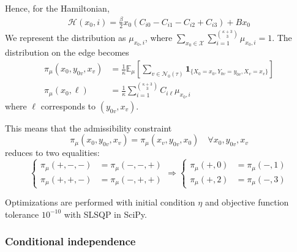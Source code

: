\documentclass[12pt]{article}
\numberwithin{equation}{section}
\begin{document}
Hence, for the Hamiltonian,
\begin{align*}
    \mathcal{H}(x_0, i) = \frac\beta2x_0(C_{i0} - C_{i1} - C_{i2} + C_{i3}) + Bx_0
\end{align*}
We represent the distribution as $\mu_{x_0, i}$, where $\sum_{x_0\in \mathcal{X}}\sum_{i=1}^{\kappa+3 \choose 3} \mu_{x_0, i} = 1$.
The distribution on the edge becomes
\begin{align*}
    \pi_\mu(x_0, y_{0v}, x_v) & = \frac1\kappa\mathbb{E}_\mu\left[\sum_{v\in\mathcal{N_0(\tau)}}\mathbf{1}_{\{X_0=x_0, Y_{0v}=y_{0v}, X_v=x_v\}}\right] \\
    \pi_\mu(x_0, \ell)        & = \frac1\kappa\sum_{i=1}^{\kappa+3 \choose 3} C_{i\ell}\mu_{x_0, i}
\end{align*}
where $\ell$ corresponds to $(y_{0v}, x_v)$.

This means that the admissibility constraint
\begin{equation*}
    \pi_\mu(x_0, y_{0v}, x_v) = \pi_\mu(x_v, y_{0v}, x_0) \quad \forall x_0, y_{0v}, x_v
\end{equation*}
reduces to two equalities:
\begin{equation*}
    \begin{cases}
        \pi_\mu(+, -, -) & = \pi_\mu(-, -, +) \\
        \pi_\mu(+, +, -) & = \pi_\mu(-, +, +)
    \end{cases}
    \Rightarrow
    \begin{cases}
        \pi_\mu(+, 0) & = \pi_\mu(-, 1) \\
        \pi_\mu(+, 2) & = \pi_\mu(-, 3)
    \end{cases}
\end{equation*}

Optimizations are performed with initial condition $\eta$ and objective function tolerance $10^{-10}$ with SLSQP in SciPy.

\subsubsection{Conditional independence}
\end{document}
